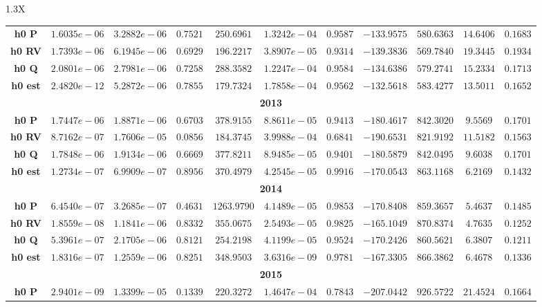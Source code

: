 \documentclass[10pt]{article}
\begin{document}
{\begin{tabularx}{1.3\textwidth}{X}
{\begin{tabular}{ccccccccccc}
 { {\bf h0 P}}& $1.6035e-06$ & $3.2882e-06$ & $0.7521$ & $250.6961$ & $1.3242e-04$ & $0.9587$ & $-133.9575$& $580.6363$& $14.6406$ &$0.1683$\\
 { {\bf h0 RV}}& $1.7393e-06$ & $6.1945e-06$ & $0.6929$ & $196.2217$ & $3.8907e-05$ & $0.9314$ & $-139.3836$& $569.7840$& $19.3445$ &$0.1934$\\
 { {\bf h0 Q}}& $2.0801e-06$ & $2.7981e-06$ & $0.7258$ & $288.3582$ & $1.2247e-04$ & $0.9584$ & $-134.6386$& $579.2741$& $15.2334$ &$0.1713$\\
 { {\bf h0 est}}& $2.4820e-12$ & $5.2872e-06$ & $0.7855$ & $179.7324$ & $1.7858e-04$ & $0.9562$ & $-132.5618$& $583.4277$& $13.5011$ &$0.1652$\\
\bottomrule
\multicolumn{11}{c}{{\bf2013}} \\
\cmidrule(r){1-11} 
 { {\bf h0 P}}& $1.7447e-06$ & $1.8871e-06$ & $0.6703$ & $378.9155$ & $8.8611e-05$ & $0.9413$ & $-180.4617$& $842.3020$& $9.5569$ &$0.1701$\\
 { {\bf h0 RV}}& $8.7162e-07$ & $1.7606e-05$ & $0.0856$ & $184.3745$ & $3.9988e-04$ & $0.6841$ & $-190.6531$& $821.9192$& $11.5182$ &$0.1563$\\
 { {\bf h0 Q}}& $1.7848e-06$ & $1.9134e-06$ & $0.6669$ & $377.8211$ & $8.9485e-05$ & $0.9401$ & $-180.5879$& $842.0495$& $9.6038$ &$0.1701$\\
 { {\bf h0 est}}& $1.2734e-07$ & $6.9909e-07$ & $0.8956$ & $370.4979$ & $4.2545e-05$ & $0.9916$ & $-170.0543$& $863.1168$& $6.2169$ &$0.1432$\\
\bottomrule
\multicolumn{11}{c}{{\bf2014}} \\
\cmidrule(r){1-11} 
 { {\bf h0 P}}& $6.4540e-07$ & $3.2685e-07$ & $0.4631$ & $1263.9790$ & $4.1489e-05$ & $0.9853$ & $-170.8408$& $859.3657$& $5.4637$ &$0.1485$\\
 { {\bf h0 RV}}& $1.8559e-08$ & $1.1841e-06$ & $0.8332$ & $355.0675$ & $2.5493e-05$ & $0.9825$ & $-165.1049$& $870.8374$& $4.7635$ &$0.1252$\\
 { {\bf h0 Q}}& $5.3961e-07$ & $2.1705e-06$ & $0.8121$ & $254.2198$ & $4.1199e-05$ & $0.9524$ & $-170.2426$& $860.5621$& $6.3807$ &$0.1211$\\
 { {\bf h0 est}}& $1.8316e-07$ & $1.2559e-06$ & $0.8251$ & $348.9503$ & $3.6316e-09$ & $0.9781$ & $-167.3305$& $866.3862$& $6.4678$ &$0.1336$\\
\bottomrule
\multicolumn{11}{c}{{\bf2015}} \\
\cmidrule(r){1-11} 
 { {\bf h0 P}}& $2.9401e-09$ & $1.3399e-05$ & $0.1339$ & $220.3272$ & $1.4647e-04$ & $0.7843$ & $-207.0442$& $926.5722$& $21.4524$ &$0.1664$\\

\end{tabular}}
\end{tabularx}}
\end{document}
